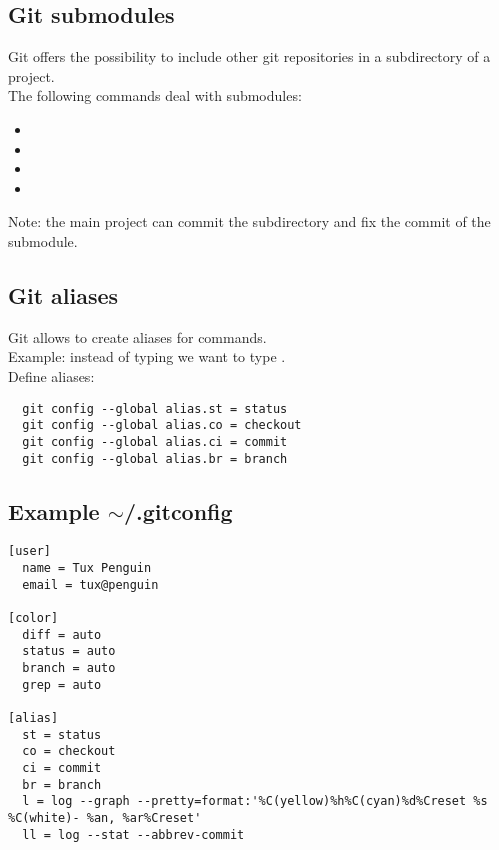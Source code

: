 \subsection{Git submodules}
\begin{frame}[fragile]
  \subslidetitle
  Git offers the possibility to include other git repositories in a subdirectory of a project.
  \\
  \vspace{1em}
  The following commands deal with submodules:
  \begin{itemize}
    \item {}
    \item {}
    \item {}
    \item {}
  \end{itemize}
  \vspace{1em}
  Note: the main project can commit the subdirectory and fix the commit of the submodule.
\end{frame}

\subsection{Git aliases}
\begin{frame}[fragile]
  \subslidetitle

  Git allows to create aliases for commands.
  \\
  \vspace{1em}
  Example:
  instead of typing  we want to type .
  \\
  \vspace{1em}
  Define aliases:

  \begin{lstlisting}
  git config --global alias.st = status
  git config --global alias.co = checkout
  git config --global alias.ci = commit
  git config --global alias.br = branch
  \end{lstlisting}

\end{frame}

\subsection{Example $\sim$/.gitconfig}
\begin{frame}[fragile]
  \subslidetitle

\begin{lstlisting}
[user]
  name = Tux Penguin
  email = tux@penguin

[color]
  diff = auto
  status = auto
  branch = auto
  grep = auto

[alias]
  st = status
  co = checkout
  ci = commit
  br = branch
  l = log --graph --pretty=format:'%C(yellow)%h%C(cyan)%d%Creset %s %C(white)- %an, %ar%Creset'
  ll = log --stat --abbrev-commit
\end{lstlisting}
\end{frame}
